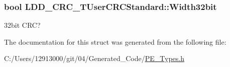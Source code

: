\subsubsection[{Width32bit}]{\setlength{\rightskip}{0pt plus 5cm}bool L\+D\+D\+\_\+\+C\+R\+C\+\_\+\+T\+User\+C\+R\+C\+Standard\+::\+Width32bit}\label{struct_l_d_d___c_r_c___t_user_c_r_c_standard_a82a24fa9104800759f278afc36a4e00e}
32bit C\+R\+C? 

The documentation for this struct was generated from the following file\+:\begin{DoxyCompactItemize}
\item 
C\+:/\+Users/12913000/git/04/\+Generated\+\_\+\+Code/\hyperlink{_p_e___types_8h}{P\+E\+\_\+\+Types.\+h}\end{DoxyCompactItemize}
